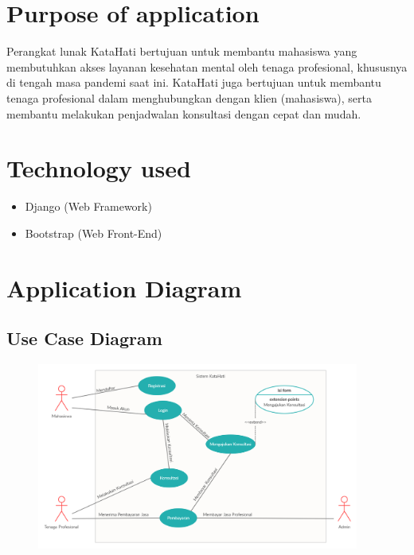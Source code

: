 \documentclass{article}
\begin{document}
	\section{Purpose of application}
	\par Perangkat lunak KataHati bertujuan untuk membantu mahasiswa yang membutuhkan akses layanan kesehatan mental oleh tenaga profesional, khususnya di tengah masa pandemi saat ini. KataHati juga bertujuan untuk membantu tenaga profesional dalam menghubungkan dengan klien (mahasiswa), serta membantu melakukan penjadwalan konsultasi dengan cepat dan mudah.
	\section{Technology used}
	\begin{itemize}
		\item Django (Web Framework)
		\item Bootstrap (Web Front-End)
	\end{itemize}
	
	\section{Application Diagram}

	\subsection{Use Case Diagram}
	\begin{figure}[H]
		\centering
		\includegraphics[width=400px]{Use Case Kata Hati.png}
	\end{figure}
\end{document}

